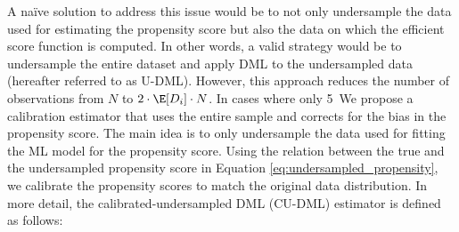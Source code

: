 A na\"ive solution to address this issue would be to not only undersample the data used for estimating the propensity score but also the data on which the efficient score function is computed. In other words, a valid strategy would be to undersample the entire dataset and apply DML to the undersampled data (hereafter referred to as U-DML). However, this approach reduces the number of observations from $N$ to $2\cdot \E[D_i] \cdot N$. In cases where only 5\
We propose a calibration estimator that uses the entire sample and corrects for the bias in the propensity score. The main idea is to only undersample the data used for fitting the ML model for the propensity score. Using the relation between the true and the undersampled propensity score in Equation \eqref{eq:undersampled_propensity}, we calibrate the propensity scores to match the original data distribution. In more detail, the calibrated-undersampled DML (CU-DML) estimator is defined as follows:


